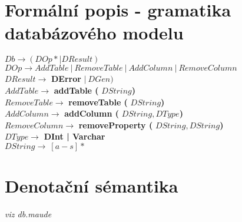 \documentclass{article}
\begin{document}
\section{Formální popis - gramatika databázového modelu}
$Db \rightarrow (DOp* | DResult )$ \\
$DOp \rightarrow AddTable \ |\ RemoveTable\ |\ AddColumn\ |\ RemoveColumn $ \\
$DResult \rightarrow$ \textbf{DError} $|\ DGen )$ \\
$AddTable \rightarrow $ \textbf{addTable (} $DString$\textbf{)} \\
$RemoveTable \rightarrow $ \textbf{removeTable (} $DString$\textbf{)} \\
$AddColumn \rightarrow $ \textbf{addColumn (} $DString, DType $\textbf{)} \\
$RemoveColumn  \rightarrow $ \textbf{removeProperty (} $DString,
DString$\textbf{)} \\
$DType \rightarrow $ \textbf{DInt | Varchar} \\
$DString \rightarrow\ [a-s]* $

\section{Denotační sémantika}
   \textit{viz db.maude}
   
   
\end{document}
